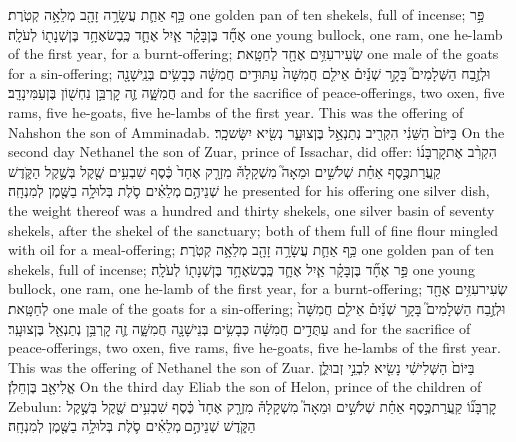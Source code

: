 \documentclass[11pt, openany]{book}
\begin{document}
{כַּ֥ף אַחַ֛ת עֲשָׂרָ֥ה זָהָ֖ב מְלֵאָ֥ה קְטֹֽרֶת׃}
{one golden pan of ten shekels, full of incense;}
{פַּ֣ר אֶחָ֞ד בֶּן\maqqaf בָּקָ֗ר אַ֧יִל אֶחָ֛ד כֶּֽבֶשׂ\maqqaf אֶחָ֥ד בֶּן\maqqaf שְׁנָת֖וֹ לְעֹלָֽה׃}
{one young bullock, one ram, one he-lamb of the first year, for a burnt-offering;}
{שְׂעִיר\maqqaf עִזִּ֥ים אֶחָ֖ד לְחַטָּֽאת׃}
{one male of the goats for a sin-offering;}
{וּלְזֶ֣בַח הַשְּׁלָמִים֮ בָּקָ֣ר שְׁנַ֒יִם֒ אֵילִ֤ם חֲמִשָּׁה֙ עַתּוּדִ֣ים חֲמִשָּׁ֔ה כְּבָשִׂ֥ים בְּנֵֽי\maqqaf שָׁנָ֖ה חֲמִשָּׁ֑ה זֶ֛ה קׇרְבַּ֥ן נַחְשׁ֖וֹן בֶּן\maqqaf עַמִּינָדָֽב׃ \petucha }
{and for the sacrifice of peace-offerings, two oxen, five rams, five he-goats, five he-lambs of the first year. This was the offering of Nahshon the son of Amminadab.}
{בַּיּוֹם֙ הַשֵּׁנִ֔י הִקְרִ֖יב נְתַנְאֵ֣ל בֶּן\maqqaf צוּעָ֑ר נְשִׂ֖יא יִשָּׂשכָֽר׃}
{On the second day Nethanel the son of Zuar, prince of Issachar, did offer:}
{הִקְרִ֨ב אֶת\maqqaf קׇרְבָּנ֜וֹ קַֽעֲרַת\maqqaf כֶּ֣סֶף אַחַ֗ת שְׁלֹשִׁ֣ים וּמֵאָה֮ מִשְׁקָלָהּ֒ מִזְרָ֤ק אֶחָד֙ כֶּ֔סֶף שִׁבְעִ֥ים שֶׁ֖קֶל בְּשֶׁ֣קֶל הַקֹּ֑דֶשׁ שְׁנֵיהֶ֣ם \legarmeh  מְלֵאִ֗ים סֹ֛לֶת בְּלוּלָ֥ה בַשֶּׁ֖מֶן לְמִנְחָֽה׃}
{he presented for his offering one silver dish, the weight thereof was a hundred and thirty shekels, one silver basin of seventy shekels, after the shekel of the sanctuary; both of them full of fine flour mingled with oil for a meal-offering;}
{כַּ֥ף אַחַ֛ת עֲשָׂרָ֥ה זָהָ֖ב מְלֵאָ֥ה קְטֹֽרֶת׃}
{one golden pan of ten shekels, full of incense;}
{פַּ֣ר אֶחָ֞ד בֶּן\maqqaf בָּקָ֗ר אַ֧יִל אֶחָ֛ד כֶּֽבֶשׂ\maqqaf אֶחָ֥ד בֶּן\maqqaf שְׁנָת֖וֹ לְעֹלָֽה׃}
{one young bullock, one ram, one he-lamb of the first year, for a burnt-offering;}
{שְׂעִיר\maqqaf עִזִּ֥ים אֶחָ֖ד לְחַטָּֽאת׃}
{one male of the goats for a sin-offering;}
{וּלְזֶ֣בַח הַשְּׁלָמִים֮ בָּקָ֣ר שְׁנַ֒יִם֒ אֵילִ֤ם חֲמִשָּׁה֙ עַתֻּדִ֣ים חֲמִשָּׁ֔ה כְּבָשִׂ֥ים בְּנֵי\maqqaf שָׁנָ֖ה חֲמִשָּׁ֑ה זֶ֛ה קׇרְבַּ֥ן נְתַנְאֵ֖ל בֶּן\maqqaf צוּעָֽר׃ \petucha }
{and for the sacrifice of peace-offerings, two oxen, five rams, five he-goats, five he-lambs of the first year. This was the offering of Nethanel the son of Zuar.}
{בַּיּוֹם֙ הַשְּׁלִישִׁ֔י נָשִׂ֖יא לִבְנֵ֣י זְבוּלֻ֑ן אֱלִיאָ֖ב בֶּן\maqqaf חֵלֹֽן׃}
{On the third day Eliab the son of Helon, prince of the children of Zebulun:}
{קׇרְבָּנ֞וֹ קַֽעֲרַת\maqqaf כֶּ֣סֶף אַחַ֗ת שְׁלֹשִׁ֣ים וּמֵאָה֮ מִשְׁקָלָהּ֒ מִזְרָ֤ק אֶחָד֙ כֶּ֔סֶף שִׁבְעִ֥ים שֶׁ֖קֶל בְּשֶׁ֣קֶל הַקֹּ֑דֶשׁ שְׁנֵיהֶ֣ם \legarmeh  מְלֵאִ֗ים סֹ֛לֶת בְּלוּלָ֥ה בַשֶּׁ֖מֶן לְמִנְחָֽה׃}
\end{document}

